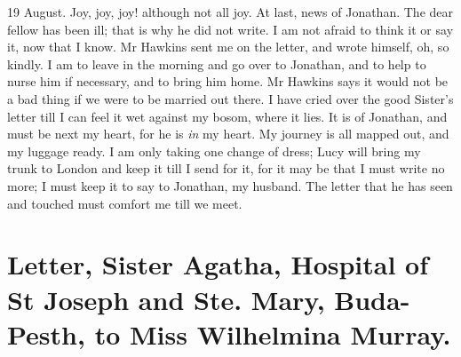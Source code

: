 \begin{diary}{19 August.}
Joy, joy, joy! although not all joy. At last, news of Jonathan. The dear fellow has been ill; that is why he did not write. I am not afraid to think it or say it, now that I know. Mr Hawkins sent me on the letter, and wrote himself, oh, so kindly. I am to leave in the morning and go over to Jonathan, and to help to nurse him if necessary, and to bring him home. Mr Hawkins says it would not be a bad thing if we were to be married out there. I have cried over the good Sister's letter till I can feel it wet against my bosom, where it lies. It is of Jonathan, and must be next my heart, for he is \textit{in} my heart. My journey is all mapped out, and my luggage ready. I am only taking one change of dress; Lucy will bring my trunk to London and keep it till I send for it, for it may be that \textellipsis I must write no more; I must keep it to say to Jonathan, my husband. The letter that he has seen and touched must comfort me till we meet.
	\end{diary}

\section{Letter, Sister Agatha, Hospital of St Joseph and Ste. Mary, Buda-Pesth, to Miss Wilhelmina Murray.}

